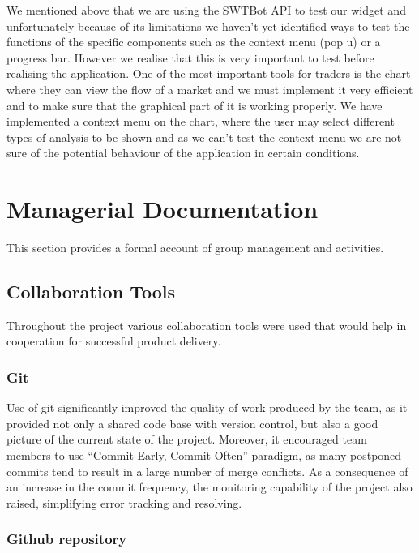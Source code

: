 \documentclass[10pt]{article}
\begin{document}
We mentioned above that we are using the SWTBot API to test our widget and unfortunately because of its limitations we haven’t yet identified ways to test the functions of the specific components such as the context menu (pop u) or a progress bar. However we realise that this is very important to test before realising the application. One of the most important tools for traders is the chart where they can view the flow of a market and we must implement it very efficient and to make sure that the graphical part of it is working properly. We have implemented a context menu on the chart, where the user may select different types of analysis to be shown and as we can’t test the context menu we are not sure of the potential behaviour of the application in certain conditions.


\section{Managerial Documentation}
\label{sec-group}

This section provides a formal account of group management and activities.

\subsection{Collaboration Tools}

Throughout the project various collaboration tools were used that would help in cooperation for successful product delivery.

\subsubsection{Git}

Use of git significantly improved the quality of work produced by the team, as it provided not only a shared code base with version control, but also a good picture of the current state of the project. Moreover, it encouraged team members to use ``Commit Early, Commit Often'' paradigm, as many postponed commits tend to result in a large number of merge conflicts. As a consequence of an increase in the commit frequency, the monitoring capability of the project also raised, simplifying error tracking and resolving.

\subsubsection{Github repository}
\end{document}
